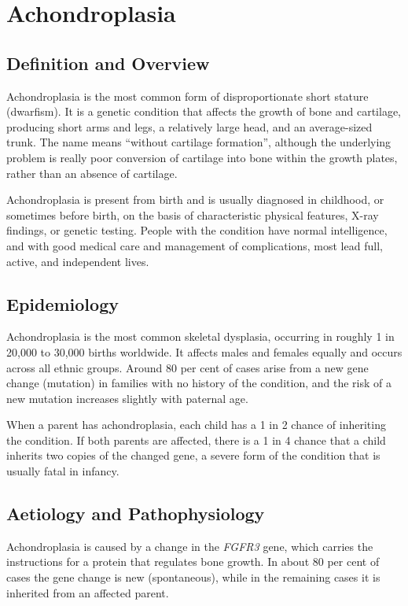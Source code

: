 \chapter{Achondroplasia}

\section*{Definition and Overview}
Achondroplasia is the most common form of disproportionate short stature (dwarfism). It is a genetic condition that affects the growth of bone and cartilage, producing short arms and legs, a relatively large head, and an average-sized trunk. The name means ``without cartilage formation'', although the underlying problem is really poor conversion of cartilage into bone within the growth plates, rather than an absence of cartilage.

Achondroplasia is present from birth and is usually diagnosed in childhood, or sometimes before birth, on the basis of characteristic physical features, X-ray findings, or genetic testing. People with the condition have normal intelligence, and with good medical care and management of complications, most lead full, active, and independent lives.

\section*{Epidemiology}
Achondroplasia is the most common skeletal dysplasia, occurring in roughly 1 in 20,000 to 30,000 births worldwide. It affects males and females equally and occurs across all ethnic groups. Around 80 per cent of cases arise from a new gene change (mutation) in families with no history of the condition, and the risk of a new mutation increases slightly with paternal age.

When a parent has achondroplasia, each child has a 1 in 2 chance of inheriting the condition. If both parents are affected, there is a 1 in 4 chance that a child inherits two copies of the changed gene, a severe form of the condition that is usually fatal in infancy.

\section*{Aetiology and Pathophysiology}
Achondroplasia is caused by a change in the \textit{FGFR3} gene, which carries the instructions for a protein that regulates bone growth. In about 80 per cent of cases the gene change is new (spontaneous), while in the remaining cases it is inherited from an affected parent.

